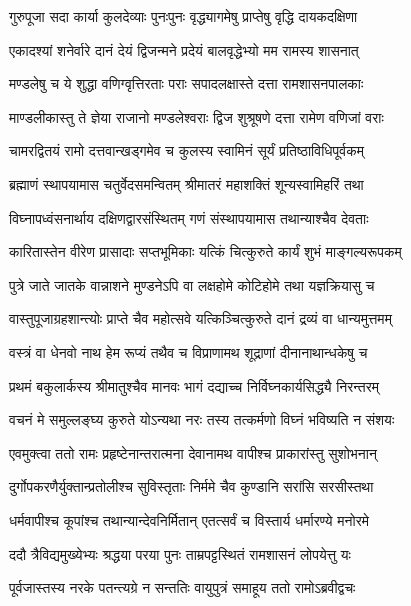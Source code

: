 \twolineshloka
{गुरुपूजा सदा कार्या कुलदेव्याः पुनःपुनः}
{वृद्ध्यागमेषु प्राप्तेषु वृद्धि दायकदक्षिणा}%

\twolineshloka
{एकादश्यां शनेर्वारे दानं देयं द्विजन्मने}
{प्रदेयं बालवृद्धेभ्यो मम रामस्य शासनात्}%

\twolineshloka
{मण्डलेषु च ये शुद्धा वणिग्वृत्तिरताः पराः}
{सपादलक्षास्ते दत्ता रामशासनपालकाः}%

\twolineshloka
{माण्डलीकास्तु ते ज्ञेया राजानो मण्डलेश्वराः}
{द्विज शुश्रूषणे दत्ता रामेण वणिजां वराः}%

\twolineshloka
{चामरद्वितयं रामो दत्तवान्खड्गमेव च}
{कुलस्य स्वामिनं सूर्यं प्रतिष्ठाविधिपूर्वकम्}%

\twolineshloka
{ब्रह्माणं स्थापयामास चतुर्वेदसमन्वितम्}
{श्रीमातरं महाशक्तिं शून्यस्वामिहरिं तथा}%

\twolineshloka
{विघ्नापध्वंसनार्थाय दक्षिणद्वारसंस्थितम्}
{गणं संस्थापयामास तथान्याश्चैव देवताः}%

\twolineshloka
{कारितास्तेन वीरेण प्रासादाः सप्तभूमिकाः}
{यत्किं चित्कुरुते कार्यं शुभं माङ्गल्यरूपकम्}%

\twolineshloka
{पुत्रे जाते जातके वान्नाशने मुण्डनेऽपि वा}
{लक्षहोमे कोटिहोमे तथा यज्ञक्रियासु च}%

\twolineshloka
{वास्तुपूजाग्रहशान्त्योः प्राप्ते चैव महोत्सवे}
{यत्किञ्चित्कुरुते दानं द्रव्यं वा धान्यमुत्तमम्}%

\twolineshloka
{वस्त्रं वा धेनवो नाथ हेम रूप्यं तथैव च}
{विप्राणामथ शूद्राणां दीनानाथान्धकेषु च}%

\twolineshloka
{प्रथमं बकुलार्कस्य श्रीमातुश्चैव मानवः}
{भागं दद्याच्च निर्विघ्नकार्यसिद्ध्यै निरन्तरम्}%

\twolineshloka
{वचनं मे समुल्लङ्घ्य कुरुते योऽन्यथा नरः}
{तस्य तत्कर्मणो विघ्नं भविष्यति न संशयः}%

\twolineshloka
{एवमुक्त्वा ततो रामः प्रहृष्टेनान्तरात्मना}
{देवानामथ वापीश्च प्राकारांस्तु सुशोभनान्}%

\twolineshloka
{दुर्गोपकरणैर्युक्तान्प्रतोलीश्च सुविस्तृताः}
{निर्ममे चैव कुण्डानि सरांसि सरसीस्तथा}%

\twolineshloka
{धर्मवापीश्च कूपांश्च तथान्यान्देवनिर्मितान्}
{एतत्सर्वं च विस्तार्य धर्मारण्ये मनोरमे}%

\twolineshloka
{ददौ त्रैविद्यमुख्येभ्यः श्रद्धया परया पुनः}
{ताम्रपट्टस्थितं रामशासनं लोपयेत्तु यः}%

\twolineshloka
{पूर्वजास्तस्य नरके पतन्त्यग्रे न सन्ततिः}
{वायुपुत्रं समाहूय ततो रामोऽब्रवीद्वचः}%

